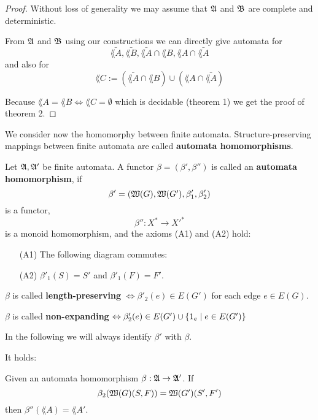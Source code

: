 \begin{proof}
Without loss of generality we may assume that $\mbox{$\mathfrak{A}$}$ and $\mbox{$\mathfrak{B}$}$ are complete
and deterministic.

From $\mbox{$\mathfrak{A}$}$ and $\mbox{$\mathfrak{B}$}$ using our constructions we can directly give automata
for 
\[\bar{\lang{A}}, \bar{\lang{B}}, \bar{\lang{A}} \cap
\lang{B}, \lang{A} \cap \bar{\lang{A}}\]
and also for 
\[ \lang{C} := (\bar{\lang{A}} \cap \lang{B}) \cup (\lang{A} \cap
\bar{\lang{A}}) \]

Because $\lang{A} = \lang{B} \Leftrightarrow \lang{C} = \emptyset$ which
is decidable (theorem 1) we get the proof of theorem 2.
\end{proof}
 
We consider now the homomorphy between finite automata. Structure-preserving
mappings between finite automata are called {\bf automata homomorphisms}.

\begin{definition}
Let $\mbox{$\mathfrak{A}$}, \mbox{$\mathfrak{A'}$}$ be finite automata. A functor $\beta = (\beta', \beta'')$
is called an {\bf automata homomorphism}, if
\[ \beta' = (\mbox{$\mathfrak{W}({G})$}, \mbox{$\mathfrak{W}({G'})$}, \beta'_1, \beta'_2) \]
is a functor,
\[ \beta'': X^* \to X'^*	\]
is a monoid homomorphism, and the axioms (A1) and (A2) hold:
\begin{itemize}
  \item[(A1)] The following diagram commutes:
  
  
  \item[(A2)] $\beta'_1(S) = S'$ and $\beta'_1(F) = F'$. 
\end{itemize}

$\beta$ is called {\bf length-preserving} $\Leftrightarrow \beta'_2(e) \in
E(G')$ for each edge $e \in E(G)$.

$\beta$ is called {\bf non-expanding} $\Leftrightarrow \beta_2'(e) \in E(G')
\cup \mbox{$\{1_e \mid e \in E(G')\}$}$
\end{definition}

In the following we will always identify $\beta'$ with $\beta$.

It holds:

\begin{theorem}
Given an automata homomorphism $\beta: \mbox{$\mathfrak{A}$} \to \mbox{$\mathfrak{A'}$}$. If
\[\beta_2(\mbox{$\mathfrak{W}({G})$}(S,F)) = \mbox{$\mathfrak{W}({G'})$}(S',F')\]
then $\beta''(\lang{A}) = \lang{A'}$.
\end{theorem}

